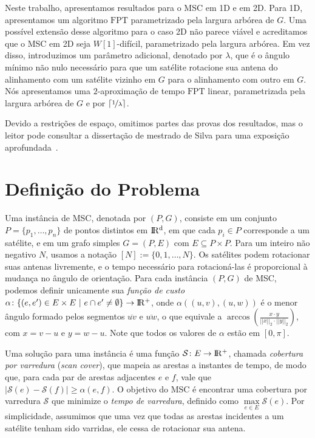\documentclass[12pt]{article}
\newcommand{\R}{\rm I\!R}
\newcommand{\cals}{\mathcal{S}}
\begin{document}
Neste trabalho, apresentamos resultados para o MSC em 1D e em 2D.
%
Para 1D, apresentamos um algoritmo $\text{FPT}$ parametrizado pela largura arbórea de $G$.
%
Uma possível extensão desse algoritmo para o caso 2D não parece viável e acreditamos que o MSC em 2D seja $W[1]$-difícil, parametrizado pela largura arbórea.
%
Em vez disso, introduzimos um parâmetro adicional, denotado por $\lambda$, que é o ângulo mínimo não nulo necessário para que um satélite rotacione sua antena do alinhamento com um satélite vizinho em $G$ para o alinhamento com outro em $G$.
%
Nós apresentamos uma $2$-aproximação de tempo $\text{FPT}$ linear, parametrizada pela largura arbórea de $G$ e por $\lceil \nicefrac{1}{\lambda} \rceil$.

Devido a restrições de espaço, omitimos partes das provas dos resultados, mas o leitor pode consultar a dissertação de mestrado de Silva para uma exposição aprofundada~\cite{Lu25}.

\section{Definição do Problema}

Uma instância de MSC, denotada por $(P, G)$, consiste em um conjunto $P = \{p_1, \dots, p_n\}$ de pontos distintos em $\R^d$, em que cada $p_i \in P$ corresponde a um satélite, e em um grafo simples $G=(P, E)$ com $E\subseteq P\times P$.
%
Para um inteiro não negativo $N$, usamos a notação $[N]:=\{0,1,\dots,N\}$.
%
Os satélites podem rotacionar suas antenas livremente, e o tempo necessário para rotacioná-las é proporcional à mudança no ângulo de orientação.
%
Para cada instância $(P, G)$ de MSC, podemos definir unicamente sua \emph{função de custo} \mbox{$\alpha\colon \{ (e, e')\in {E\times E}\ |\ e\cap e' \ne\emptyset \} \to \R^+$}, onde $\alpha((u, v), (u, w))$ é o menor ângulo formado pelos segmentos $\overline{uv}$ e $\overline{uw}$, o que equivale a $\arccos{(\frac{x\cdot y}{||x||_2\cdot ||y||_2})}$, com $x=v-u$ e $y=w-u$. Note que todos os valores de $\alpha$ estão em $[0, \pi]$.

Uma solução para uma instância é uma função ${\cals\colon E\to \R^+}$, chamada \emph{cobertura por varredura} (\emph{scan cover}), que mapeia as arestas a instantes de tempo, de modo que, para cada par de arestas adjacentes $e$ e $f$, vale que ${|\cals(e) - \cals(f)| \geq \alpha(e, f)}$.
%
O objetivo do MSC é encontrar uma cobertura por varredura $\cals$ que minimize o \emph{tempo de varredura}, definido como $\max\limits_{e\in E} \cals(e)$.
%
Por simplicidade, assumimos que uma vez que todas as arestas incidentes a um satélite tenham sido varridas, ele cessa de rotacionar sua antena.
\end{document}
